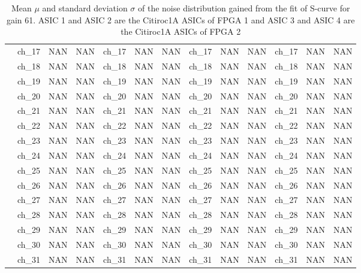 \begin{table}
{\begin{tabular}{|c|c|c|c|c|c|c|c|c|c|c|c|c|}
        &ch\_17 & NAN & NAN & ch\_17 & NAN & NAN & ch\_17 & NAN & NAN & ch\_17 & NAN & NAN \\
        &ch\_18 & NAN & NAN & ch\_18 & NAN & NAN & ch\_18 & NAN & NAN & ch\_18 & NAN & NAN \\
        &ch\_19 & NAN & NAN & ch\_19 & NAN & NAN & ch\_19 & NAN & NAN & ch\_19 & NAN & NAN \\
        &ch\_20 & NAN & NAN & ch\_20 & NAN & NAN & ch\_20 & NAN & NAN & ch\_20 & NAN & NAN \\
        &ch\_21 & NAN & NAN & ch\_21 & NAN & NAN & ch\_21 & NAN & NAN & ch\_21 & NAN & NAN \\
        &ch\_22 & NAN & NAN & ch\_22 & NAN & NAN & ch\_22 & NAN & NAN & ch\_22 & NAN & NAN \\
        &ch\_23 & NAN & NAN & ch\_23 & NAN & NAN & ch\_23 & NAN & NAN & ch\_23 & NAN & NAN \\
        &ch\_24 & NAN & NAN & ch\_24 & NAN & NAN & ch\_24 & NAN & NAN & ch\_24 & NAN & NAN \\
        &ch\_25 & NAN & NAN & ch\_25 & NAN & NAN & ch\_25 & NAN & NAN & ch\_25 & NAN & NAN \\
        &ch\_26 & NAN & NAN & ch\_26 & NAN & NAN & ch\_26 & NAN & NAN & ch\_26 & NAN & NAN \\
        &ch\_27 & NAN & NAN & ch\_27 & NAN & NAN & ch\_27 & NAN & NAN & ch\_27 & NAN & NAN \\
        &ch\_28 & NAN & NAN & ch\_28 & NAN & NAN & ch\_28 & NAN & NAN & ch\_28 & NAN & NAN \\
        &ch\_29 & NAN & NAN & ch\_29 & NAN & NAN & ch\_29 & NAN & NAN & ch\_29 & NAN & NAN \\
        &ch\_30 & NAN & NAN & ch\_30 & NAN & NAN & ch\_30 & NAN & NAN & ch\_30 & NAN & NAN \\
        &ch\_31 & NAN & NAN & ch\_31 & NAN & NAN & ch\_31 & NAN & NAN & ch\_31 & NAN & NAN \\
        \hline
    \end{tabular}
    }
    \caption{Mean $\mu$ and standard deviation $\sigma$ of the noise distribution gained from the fit of S-curve for gain 61. ASIC 1 and ASIC 2 are the Citiroc1A ASICs of FPGA 1 and ASIC 3 and ASIC 4 are the Citiroc1A ASICs of FPGA 2}
    \label{tab:noise_parameter_2}
\end{table}
